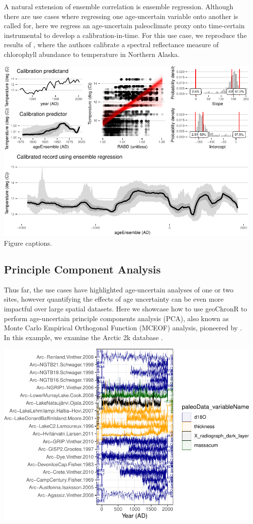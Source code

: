 \documentclass[gc, manuscript]{copernicus}
\begin{document}
A natural extension of ensemble correlation is ensemble regression.
Although there are use cases where regressing one age-uncertain variable
onto another is called for, here we regress an age-uncertain
paleoclimate proxy onto time-certain instrumental to develop a
calibration-in-time. For this use case, we reproduce the results of
\citet{Boldt:2015}, where the authors calibrate a spectral reflectance
measure of chlorophyll abundance to temperature in Northern Alaska.

\includegraphics{geoChronR-paper_files/figure-latex/unnamed-chunk-9-1.pdf}
Figure captions.

\subsection{Principle Component Analysis}

Thus far, the use cases have highlighted age-uncertain analyses of one
or two sites, however quantifying the effects of age uncertainty can be
even more impactful over large spatial datasets. Here we showcase how to
use geoChronR to perform age-uncertain principle components analysis
(PCA), also known as Monte Carlo Empirical Orthogonal Function (MCEOF)
analysis, pioneered by \citet{anchukaitis2013mceof}. In this example, we
examine the Arctic 2k database \citep{McKayKaufman2014McKayKaufman2014}.

\includegraphics{geoChronR-paper_files/figure-latex/unnamed-chunk-11-1.pdf}
\end{document}
